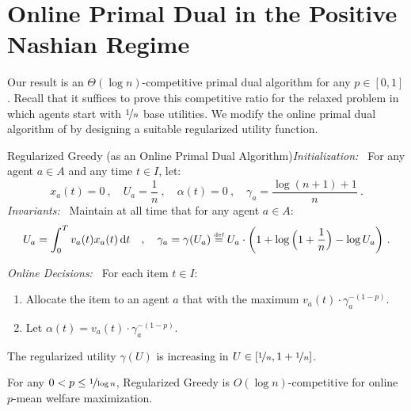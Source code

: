 \documentclass[11pt,letterpaper]{article}
\newcommand{\dif}[1]{\,\text{\rm d} #1}
\newcommand{\utility}{U}
\newcommand{\defeq}{\stackrel{\textrm{\tiny def}}{=}}
\begin{document}
    
    


\section{Online Primal Dual in the Positive Nashian Regime}
\label{app:positive-nashian}







    

Our result is an $\Theta(\log n)$-competitive primal dual algorithm for any $p\in [0,1]$.
Recall that it suffices to prove this competitive ratio for the relaxed problem in which agents start with $\nicefrac{1}{n}$ base utilities.
We modify the online primal dual algorithm of \citet{DevanurJ:STOC:2012} by designing a suitable regularized utility function.



\begin{algorithm}{Regularized Greedy (as an Online Primal Dual Algorithm)}\emph{Initialization:~}
	For any agent $a\in A$ and any time $t\in I$, let:
	\[
		x_a(t) = 0 ~,\quad \utility_a = \frac{1}{n} ~,\quad \alpha(t) = 0 ~,\quad \gamma_a = \frac{\log(n+1)+1}{n}
		~.
	\]
	\emph{Invariants:~}
	Maintain at all time that for any agent $a\in A$:
	\begin{equation}
		\label{eq:invariant-log(n)}
		\utility_a = \int_0^T v_a(t) x_a(t) \dif{t} \quad,\quad \gamma_a = \gamma(\utility_a) \defeq \utility_a \cdot \bigg(1+\log\Big(1+\frac{1}{n}\Big)-\log \utility_a\bigg)
		~.
	\end{equation}
	
	\emph{Online Decisions:~}
	For each item $t\in I$:
	\begin{enumerate}
		\item Allocate the item to an agent $a$ that with the maximum $v_a(t) \cdot \gamma_a^{-(1-p)}$.	
		\item Let $\alpha(t) = v_a(t) \cdot \gamma_a^{-(1-p)}$.
	\end{enumerate}
\end{algorithm}


\begin{lemma}
    \label{lem:p>0-invariant-gamma_a-properties}
    The regularized utility $\gamma(\utility)$ is increasing in $\utility \in [\nicefrac{1}{n}, 1+\nicefrac{1}{n}]$.
\end{lemma}
    

\begin{theorem}
    \label{thm:p>0-log(n)}
    For any $0 < p \le \nicefrac{1}{\log n}$, Regularized Greedy is $O(\log n)$-competitive for online $p$-mean welfare maximization.
\end{theorem}
\end{document}
